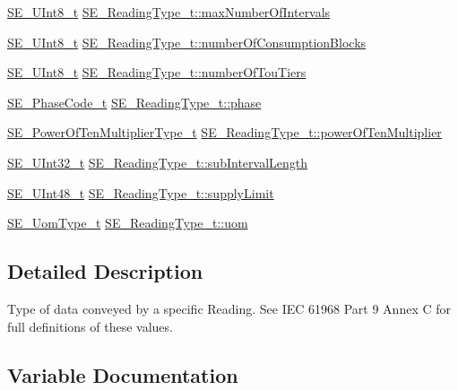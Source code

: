 \begin{DoxyCompactItemize}
\item 
\hyperlink{group__UInt8_gaf7c365a1acfe204e3a67c16ed44572f5}{S\+E\+\_\+\+U\+Int8\+\_\+t} \hyperlink{group__ReadingType_ga2d016202de3cc2404cf2065adeaeb4f7}{S\+E\+\_\+\+Reading\+Type\+\_\+t\+::max\+Number\+Of\+Intervals}
\item 
\hyperlink{group__UInt8_gaf7c365a1acfe204e3a67c16ed44572f5}{S\+E\+\_\+\+U\+Int8\+\_\+t} \hyperlink{group__ReadingType_gaf04b33d882d8c1fc9a5234d3a2a7f01b}{S\+E\+\_\+\+Reading\+Type\+\_\+t\+::number\+Of\+Consumption\+Blocks}
\item 
\hyperlink{group__UInt8_gaf7c365a1acfe204e3a67c16ed44572f5}{S\+E\+\_\+\+U\+Int8\+\_\+t} \hyperlink{group__ReadingType_ga815c888ead50b860c86080e455b1bb2b}{S\+E\+\_\+\+Reading\+Type\+\_\+t\+::number\+Of\+Tou\+Tiers}
\item 
\hyperlink{group__PhaseCode_ga3eb7ce6c8beb3531baf0ba7723a2782c}{S\+E\+\_\+\+Phase\+Code\+\_\+t} \hyperlink{group__ReadingType_ga3857d20c24886f3715200ce0f9dd6f06}{S\+E\+\_\+\+Reading\+Type\+\_\+t\+::phase}
\item 
\hyperlink{group__PowerOfTenMultiplierType_gaf0317b781dc8dbb9cb6ac4e44a14fdef}{S\+E\+\_\+\+Power\+Of\+Ten\+Multiplier\+Type\+\_\+t} \hyperlink{group__ReadingType_ga11cd4f657954c77645c4a09c3a7964a3}{S\+E\+\_\+\+Reading\+Type\+\_\+t\+::power\+Of\+Ten\+Multiplier}
\item 
\hyperlink{group__UInt32_ga70bd4ecda3c0c85d20779d685a270cdb}{S\+E\+\_\+\+U\+Int32\+\_\+t} \hyperlink{group__ReadingType_gaba391fb84126105e4f4d8f6428906b99}{S\+E\+\_\+\+Reading\+Type\+\_\+t\+::sub\+Interval\+Length}
\item 
\hyperlink{group__UInt48_gaa15d726fc29126d24b991437334d77a0}{S\+E\+\_\+\+U\+Int48\+\_\+t} \hyperlink{group__ReadingType_gae36049c7b71555f2c13bd42dc32453e7}{S\+E\+\_\+\+Reading\+Type\+\_\+t\+::supply\+Limit}
\item 
\hyperlink{group__UomType_ga35de8fcdea40d7edbdd341581cf651f1}{S\+E\+\_\+\+Uom\+Type\+\_\+t} \hyperlink{group__ReadingType_ga1b34c217f3198c9de70789e4517720c4}{S\+E\+\_\+\+Reading\+Type\+\_\+t\+::uom}
\end{DoxyCompactItemize}


\subsection{Detailed Description}
Type of data conveyed by a specific Reading. See I\+EC 61968 Part 9 Annex C for full definitions of these values. 

\subsection{Variable Documentation}
\mbox{\label{group__ReadingType_ga0b47ada65894fa1e36bc0d185d21a71d}} 
